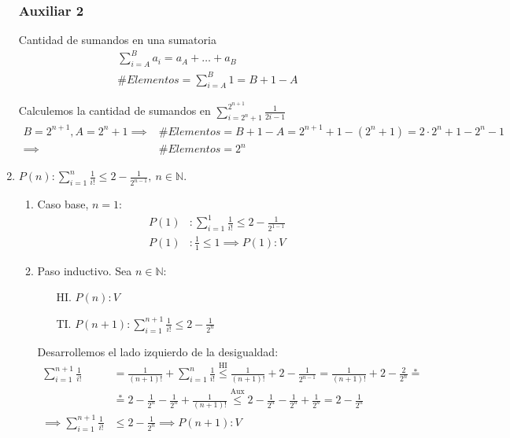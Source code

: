 \begin{enumerate}[label=\roman*)]
    \subsubsection*{Auxiliar 2}

    Cantidad de sumandos en una sumatoria
    \begin{align*}
        \sum_{i=A}^{B}a_i = a_A + \dots + a_B \\
        \# Elementos = \sum_{i=A}^{B}1 = B + 1 - A
    \end{align*}

    Calculemos la cantidad de sumandos en $\displaystyle \sum_{i=2^n + 1}^{2^{n+1}} \frac{1}{2i-1}$
    \begin{align*}
        B = 2^{n+1}, A = 2^n + 1 \implies &\# Elementos = B + 1 - A = 2^{n+1} + 1  - (2^n + 1) 
        = 2 \cdot 2^n + 1 - 2^n -1 \\
        \implies &\# Elementos = 2^n
    \end{align*}


    \item $P(n):\displaystyle \sum_{i=1}^{n} \frac{1}{i!} \leq 2 - \frac{1}{2^{n-1}}, \ n \in \mathbb{N}$.
    \begin{enumerate}[label=\arabic*)]
        \item Caso base, $n = 1$:
        \begin{align*}
            P(1)&: \sum_{i=1}^{1} \frac{1}{i!} \leq 2 - \frac{1}{2^{1-1}} \\
            P(1)&: \frac{1}{1} \leq 1 \implies P(1):V
        \end{align*}
        \item Paso inductivo. Sea $n \in \mathbb{N}$:
        \begin{enumerate}
            \item[HI.] $P(n): V$
            \item[TI.] $P(n+1): \displaystyle \sum_{i=1}^{n+1} \frac{1}{i!} \leq 2 - \frac{1}{2^{n}}$
        \end{enumerate}

        Desarrollemos el lado izquierdo de la desigualdad:
        \begin{align*}
            \sum_{i=1}^{n+1} \frac{1}{i!} &= \frac{1}{(n+1)!} + \sum_{i=1}^{n} \frac{1}{i!} \overset{\text{HI}}{\leq}
            \frac{1}{(n+1)!} + 2 - \frac{1}{2^{n-1}} = \frac{1}{(n+1)!} + 2 - \frac{2}{2^{n}} \overset{*}{=} \\
            &\overset{*}{=}  2 - \frac{1}{2^{n}} - \frac{1}{2^{n}} + \frac{1}{(n+1)!} \overset{\text{Aux}}{\leq}
            2 - \frac{1}{2^{n}} - \frac{1}{2^{n}} + \frac{1}{2^{n}} = 2 - \frac{1}{2^{n}} \\
            \implies \sum_{i=1}^{n+1} \frac{1}{i!} &\leq 2 - \frac{1}{2^{n}} \implies P(n+1):V
        \end{align*}
    \end{enumerate}


\end{enumerate}
